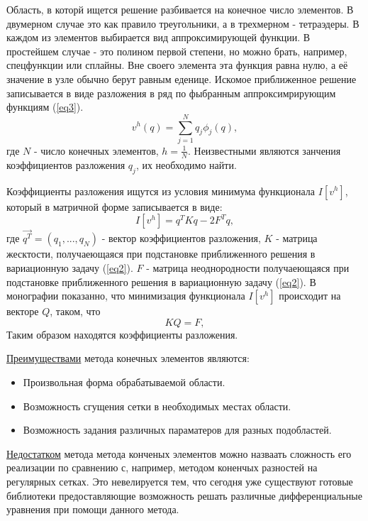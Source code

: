 \documentclass[a4paper,12pt]{report} %
\begin{document}
Область, в которй ищется решение разбивается на конечное число элементов. В двумерном случае это как правило треугольники, а в трехмерном - тетраэдеры. В каждом из элементов выбирается вид аппроксимирующей функции. В простейшем случае - это полином первой степени, но можно брать, например, спецфункции или сплайны. Вне своего элемента эта функция равна нулю, а её значение в узле обычно берут равным еденице. Искомое приближенное решение записывается в виде разложения в ряд по фыбранным аппроксимрирующим функциям (\ref{eq3}).
\begin{equation}\label{eq3}
    v^h(q) = \sum_{j = 1}^Nq_j\phi_j(q),
\end{equation}
где $N$ - число конечных элементов,  
$h = \frac{1}{N}$. Неизвестными являются занчения коэффициентов разложения $q_j$, их необходимо найти.

Коэффициенты разложения ищутся из условия минимума функционала $I[v^h]$, который в матричной форме записывается в виде:
\begin{equation}\label{eq4}
    I[v^h] = q^TKq-2F^Tq,
\end{equation}
 где $\Vec{q^{T}} = (q_1, ..., q_N)$ - вектор коэффициентов разложения,
$K$ - матрица жесктости, получаеющаяся при подстановке приближенного решения в вариационную задачу (\ref{eq2}).
$F$ - матрица неоднородности получаеющаяся при подстановке приближенного решения в вариационную задачу (\ref{eq2}).
В монографии \cite{book4} показанно, что минимизация функционала $I[v^h]$ происходит на векторе $Q$, таком, что 
\begin{equation}\label{eq5}
    KQ = F,
\end{equation}
Таким образом находятся коэффициенты разложения.

\underline{Преимуществами} метода конечных элементов являются:
\begin{itemize}
  \item Произвольная форма обрабатываемой области.
  \item Возможность сгущения сетки в необходимых местах области.
  \item Возможность задания различных параматеров для разных подобластей.
\end{itemize}

\underline{Недостатком} метода метода конченых элементов можно назваать сложность его реализации по сравнению с, например, методом коненчых разностей на регулярных сетках. Это невелируется тем, что сегодня уже существуют готовые библиотеки предоставляющие возможность решать различные дифференциальные уравнения при помощи данного метода.
\end{document}
